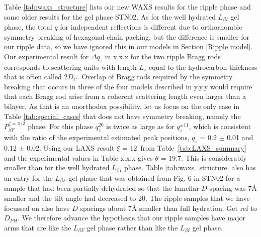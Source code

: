 Table \ref{tab:waxs_structure} lists our new WAXS results for the ripple phase and some older results for the gel phase STN02.  As for the well hydrated $L_{\beta I}$ gel phase, the total $q$ for independent reflections is different due to 
orthorhombic symmetry breaking of hexagonal chain packing, but the difference is smaller for our ripple data, so we have ignored this in our models in Section \ref{Ripple model}.  
Our experimental result for ${\Delta}q_z$ in x.x.x for the two ripple Bragg rods corresponds to scattering units with length $L_z$ equal to the hydrocarbon thickness that is often called 2$D_C$. Overlap of Bragg rods required by the symmetry breaking that occurs in three of the four models described in y.y.y would require that each Bragg rod arise from a coherent scattering length even larger than a bilayer.  As that is an unorthodox possibility, let us focus on the only case in Table \ref{tab:special_cases} that does not have symmetry breaking, namely the $P_{\beta F}^{\zeta=\pi/2}$ phase.  For this phase $q_z^{20}$  
is twice as large as for $q_z^{{\pm}11}$,
which is consistent with the ratio of the experimental estimated peak positions, $q_z$ = 0.2 $\pm$ 0.01 and
0.12 $\pm$ 0.02. 
Using our LAXS result $\xi$ = 12\textdegree\ from Table~\ref{tab:LAXS_summary} and the experimental
values in Table x.x.x gives %
$\theta$ = 19.7\textdegree. This is considerably smaller than for the well hydrated $L_{\beta I}$ phase. Table \ref{tab:waxs_structure} also has an entry for the $L_{\beta F}$ gel phase that was obtained from Fig. 6 in STN02 for a sample that had been partially dehydrated so that the lamellar $D$ spacing was 7{\AA} smaller and the tilt angle had decreased to 20{\textdegree}. The ripple samples that we have focussed on also have $D$ spacings about 7{\AA} smaller than full hydration. {\jn Get ref to $D_{FH}$.} We therefore advance the hypothesis that our ripple samples have major arms that are like the $L_{\beta F}$ gel phase rather than like the $L_{\beta I}$ gel phase.

